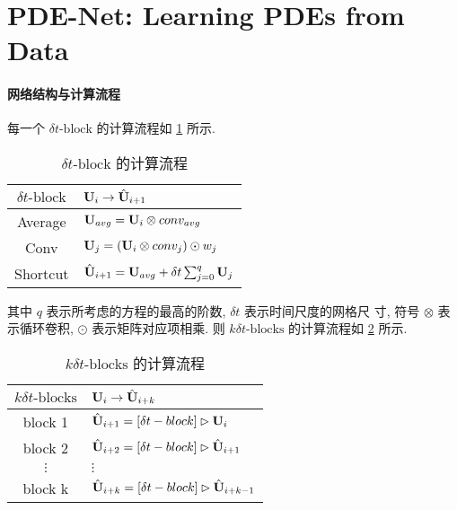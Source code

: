 \section{PDE-Net: Learning PDEs from Data}
\paragraph{网络结构与计算流程}
每一个 $\delta t\text{-block}$ 的计算流程如 \ref{tab:pde-net-dtblock} 所示.

\begin{table}[h]\centering
\begin{tabular}{cl}
\toprule
$\delta t\text{-block}$ & ${\mathbf U}_i \to \hat {{\mathbf U}}_{i + 1}$ \\
\midrule
Average & ${\mathbf U}_{avg} = {\mathbf U}_i \otimes conv_{avg}$ \\
Conv & ${\mathbf U}_j = ({\mathbf U}_i \otimes conv_j) \odot w_j$ \\
Shortcut & $\hat {{\mathbf U}}_{i + 1} = {\mathbf U}_{avg} + \delta t \sum_{j=0}^q {\mathbf U}_j$ \\
\bottomrule
\end{tabular}
\caption{$\delta t\text{-block}$ 的计算流程}
\label{tab:pde-net-dtblock}
\end{table}

\noindent 其中 $q$ 表示所考虑的方程的最高的阶数, $\delta t$ 表示时间尺度的网格尺
寸, 符号 $\otimes$ 表示循环卷积, $\odot$ 表示矩阵对应项相乘. 则
$k\delta t\text{-blocks}$ 的计算流程如 \ref{tab:pde-net-kdtblocks} 所示.

\begin{table}[h]\centering
\begin{tabular}{cl}
\toprule
$k\delta t\text{-blocks}$ & ${\mathbf U}_i \to \hat {{\mathbf U}}_{i + k}$ \\
\midrule
block 1 & $\hat {{\mathbf U}}_{i + 1} = [\delta t-block]\rhd{\mathbf U}_i$ \\
block 2 & $\hat {{\mathbf U}}_{i + 2} = [\delta t-block]\rhd\hat{{\mathbf U}}_{i + 1}$ \\
$\vdots$ & $\vdots$ \\
block k & $\hat {{\mathbf U}}_{i + k} = [\delta t-block]\rhd\hat{{\mathbf U}}_{i+k-1}$ \\
\bottomrule
\end{tabular}
\caption{$k\delta t\text{-blocks}$ 的计算流程}
\label{tab:pde-net-kdtblocks}
\end{table}


